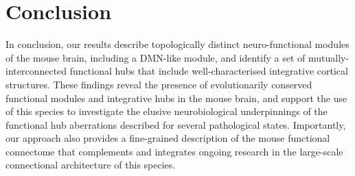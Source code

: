 \section{Conclusion}

In conclusion, our results describe topologically distinct neuro-functional
modules of the mouse brain, including a DMN-like module, and identify a set of
mutually-interconnected functional hubs that include well-characterised
integrative cortical structures. These findings reveal the presence of
evolutionarily conserved functional modules and integrative hubs in the mouse
brain, and support the use of this species to investigate the elusive
neurobiological underpinnings of the functional hub aberrations described for
several pathological states. Importantly, our approach also provides a
fine-grained description of the mouse functional connectome that complements and
integrates ongoing research in the large-scale connectional architecture of this
species. 

